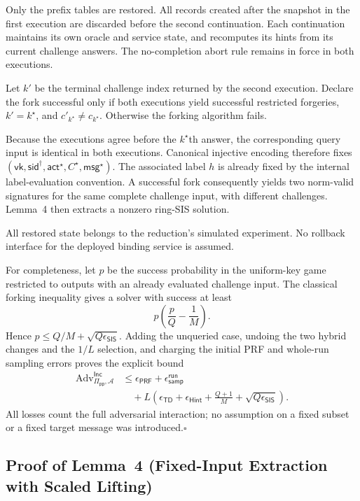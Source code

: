 \documentclass[lettersize,journal]{IEEEtran}
\begin{document}
	Only the prefix tables are restored.
	All records created after the snapshot in the first execution
	are discarded before the second continuation.
	Each continuation maintains its own oracle and service state,
	and recomputes its hints from its current challenge answers.
	The no-completion abort rule remains in force in both executions.
	
	Let $k'$ be the terminal challenge index returned by the second
	execution.
	Declare the fork successful only if both executions yield successful
	restricted forgeries, $k'=k^\star$, and
	$c'_{k^\star}\ne c_{k^\star}$.
	Otherwise the forking algorithm fails.
	
	Because the executions agree before the $k^\star$th answer,
	the corresponding query input is identical in both executions.
	Canonical injective encoding therefore fixes
	$(\mathsf{vk},\mathsf{sid}^{\dagger},
	\mathsf{act}^{\star},C^{\star},\mathsf{msg}^{\star})$.
	The associated label $h$ is already fixed by the internal
	label-evaluation convention.
	A successful fork consequently yields two norm-valid signatures
	for the same complete challenge input, with different challenges.
	Lemma~4 then extracts a nonzero ring-SIS solution.
	
	All restored state belongs to the reduction's simulated experiment.
	No rollback interface for the deployed binding service is assumed.
	
	For completeness, let $p$ be the success probability in the uniform-key
	game restricted to outputs with an already evaluated challenge input.
	The classical forking inequality
	gives a solver with success at least
	\[
	p\left(\frac pQ-\frac1M\right).
	\]
	Hence $p\leq Q/M+\sqrt{Q\epsilon_{\mathsf{SIS}}}$. Adding the unqueried
	case, undoing the two hybrid changes and the $1/L$ selection, and charging
	the initial PRF and whole-run sampling errors proves the explicit bound
	\[
	\begin{aligned}
	\operatorname{Adv}^{\mathsf{Inc}}_{\Pi_{\mathsf{pp}},\mathcal A}
	&\leq\epsilon_{\mathsf{PRF}}+\epsilon_{\mathsf{samp}}^{\mathsf{run}}\\
	&\quad+L\left(\epsilon_{\mathsf{TD}}+\epsilon_{\mathsf{Hint}}
	+\frac{Q+1}{M}+\sqrt{Q\epsilon_{\mathsf{SIS}}}\right).
	\end{aligned}
	\]
	All losses count the full adversarial
	interaction; no assumption on a fixed subset or a fixed target message was
	introduced.\hfill$\square$
	
	\subsection{Proof of Lemma~4 (Fixed-Input Extraction with Scaled Lifting)}
	\label{app:talon-lemma4-proof}
	
\end{document}
